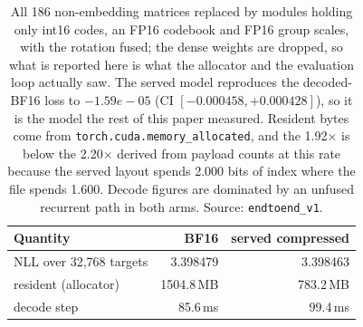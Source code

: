 \begin{table}[t]
\centering
\small
\begin{tabular}{lrr}
\toprule
Quantity & BF16 & served compressed \\
\midrule
NLL over 32,768 targets & 3.398479 & 3.398463 \\
resident (allocator) & 1504.8\,MB & 783.2\,MB \\
decode step & 85.6\,ms & 99.4\,ms \\
\bottomrule
\end{tabular}
\caption{All 186 non-embedding matrices replaced by modules holding only int16 codes, an FP16 codebook and FP16 group scales, with the rotation fused; the dense weights are dropped, so what is reported here is what the allocator and the evaluation loop actually saw. The served model reproduces the decoded-BF16 loss to $-1.59e-05$ (CI $[-0.000458, +0.000428]$), so it is the model the rest of this paper measured. Resident bytes come from \texttt{torch.cuda.memory\_allocated}, and the 1.92$\times$ is below the 2.20$\times$ derived from payload counts at this rate because the served layout spends 2.000 bits of index where the file spends 1.600. Decode figures are dominated by an unfused recurrent path in both arms. Source: \texttt{endtoend\_v1}.}
\label{tab:e2e}
\end{table}
